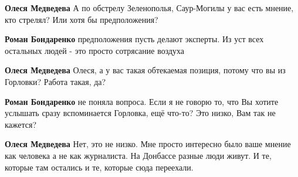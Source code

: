 \begin{itemize}
\begin{itemize}
 
\textbf{Олеся Медведева} А по обстрелу Зеленополья, Саур-Могилы у вас есть мнение, кто стрелял? Или хотя бы предположения?

 
\textbf{Роман Бондаренко} предположения пусть делают эксперты. Из уст всех остальных людей - это просто сотрясание воздуха

 
\textbf{Олеся Медведева} Олеся, а у вас такая обтекаемая позиция, потому что вы из Горловки? Работа такая, да?

 
\textbf{Роман Бондаренко} не поняла вопроса. Если я не говорю то, что Вы хотите услышать сразу вспоминается Горловка, ещё что-то?
Это низко, Вам так не кажется?

 
\textbf{Олеся Медведева} Нет, это не низко. Мне просто интересно было ваше мнение как человека а не как журналиста. На Донбассе разные люди живут. И те, которые там остались и те, которые сюда переехали.

 

\end{itemize}
\end{itemize}
